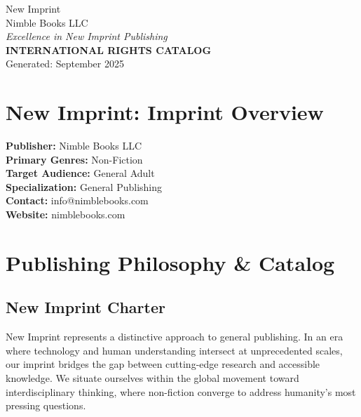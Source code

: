 \documentclass[11pt]{article}
\begin{document}
\thispagestyle{firstpage}

\begin{center}
{\Huge \textcolor{primarycolor}{New Imprint}}\\[0.3cm]
{\Large \textcolor{secondarycolor}{Nimble Books LLC}}\\[0.2cm]
{\large \textit{Excellence in New Imprint Publishing}}\\[0.5cm]
{\large \textbf{INTERNATIONAL RIGHTS CATALOG}}\\[0.3cm]
{\normalsize Generated: September 2025}
\end{center}

\vspace{1cm}

\section{New Imprint: Imprint Overview}

\textbf{Publisher:} Nimble Books LLC\\
\textbf{Primary Genres:} Non-Fiction\\
\textbf{Target Audience:} General Adult\\
\textbf{Specialization:} General Publishing\\
\textbf{Contact:} info@nimblebooks.com\\
\textbf{Website:} nimblebooks.com\\

\vspace{1cm}

\section{Publishing Philosophy \& Catalog}

\subsection{New Imprint Charter}

New Imprint represents a distinctive approach to general publishing. In an era where technology and human understanding intersect at unprecedented scales, our imprint bridges the gap between cutting-edge research and accessible knowledge. We situate ourselves within the global movement toward interdisciplinary thinking, where non-fiction converge to address humanity's most pressing questions.
\end{document}
